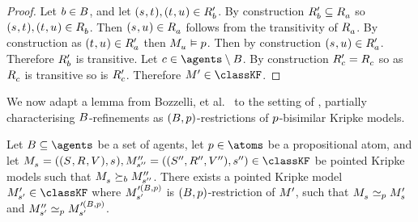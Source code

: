 \begin{proof}
Let $\agentB \in \agentsB$, and let $(\kStateS, \kStateT), (\kStateT, \kStateU) \in \kAccessibilityPB$.
By construction $\kAccessibilityPB \subseteq \kAccessibilityA$ so $(\kStateS, \kStateT), (\kStateT, \kStateU) \in \kAccessibilityB$.
Then $(\kStateS, \kStateU) \in \kAccessibilityA$ follows from the transitivity of $\kAccessibilityA$.
By construction as $(\kStateT, \kStateU) \in \kAccessibilityPA$ then $\kPModel{\kStateU} \entails \atomP$.
Then by construction $(\kStateS, \kStateU) \in \kAccessibilityPA$.
Therefore $\kAccessibilityPB$ is transitive.
Let $\agentC \in \agents \setminus \agentsB$.
By construction $\kAccessibilityPC = \kAccessibilityC$ so as $\kAccessibilityC$ is transitive so is $\kAccessibilityPC$.
Therefore $\kModelP \in \classKF$.
\end{proof}

We now adapt a lemma from Bozzelli, et al.~\cite{bozzelli:2014b} to the setting of \classKF{}, partially characterising $\agentsB$-refinements as $(\agentsB, \atomP)$-restrictions of $\atomP$-bisimilar Kripke models.

\begin{lemma}\label{rml-k4-refinement-p-bisimulation}
Let $\agentsB \subseteq \agents$ be a set of agents, let $\atomP \in \atoms$ be a propositional atom, and let $\kPModelAndTuple{\kStateS}, \kPModelAndTuplePP{\kStateSPP} \in \classKF$ be pointed Kripke models such that $\kPModel{\kStateS} \simulatesB \kPModelPP{\kStateSPP}$.
There exists a pointed Kripke model $\kPModelP{\kStateSP} \in \classKF$ where $\kPModel[\prime(\agentsB, \atomP)]{\kStateSP}$ is $(\agentsB, \atomP)$-restriction of $\kModelP$, such that $\kPModel{\kStateS} \bisimilar[\atomP] \kPModelP{\kStateS}$ and $\kPModelPP{\kStateSP} \bisimilar[\atomP] \kPModel[\prime(\agentsB, \atomP)]{\kStateSP}$.
\end{lemma}

